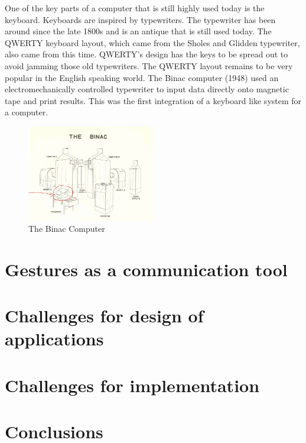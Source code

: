 \documentclass{article}
\begin{document}
One of the key parts of a computer that is still highly used today is the keyboard. Keyboards are inspired by typewriters. The typewriter has been around since the late 1800s and is an antique that is still used today. The QWERTY keyboard layout, which came from the Sholes and Glidden typewriter, also came from this time. QWERTY's design has the keys to be spread out to avoid jamming those old typewriters. The QWERTY layout remains to be very popular in the English speaking world. The Binac computer (1948) used an electromechanically controlled typewriter to input data directly onto magnetic tape and print results. This was the first integration of a keyboard like system for a computer. \cite{ref3}

\begin{figure}[h!]
    \caption{The Binac Computer \cite{ref4}}
    \label{image:BINAC}
    \centering
    \includegraphics[width=0.5\textwidth]{pics/binac.jpg}
\end{figure}


\section{Gestures as a communication tool}

\section{Challenges for design of applications}

\section{Challenges for implementation}

\section{Conclusions}
\end{document}
